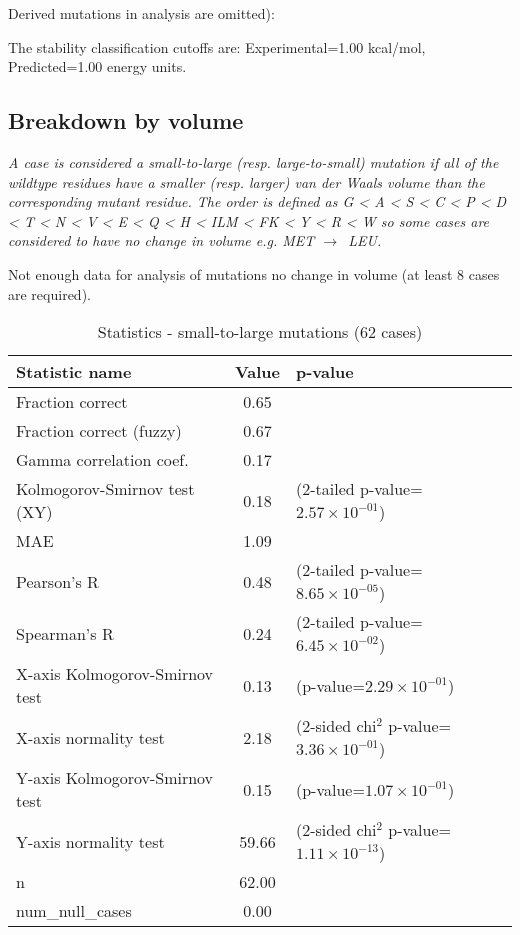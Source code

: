 \documentclass[10pt, letterpaper, oneside, titlepage, landscape]{scrreprt}
\begin{document}
Derived mutations in analysis are omitted):

The stability classification cutoffs are: Experimental=1.00 kcal/mol, Predicted=1.00 energy units.
\subsection{Breakdown by volume}
\textit{A case is considered a small-to-large (resp. large-to-small) mutation if all of the wildtype residues have a smaller (resp. larger) van der Waals volume than the corresponding mutant residue. The order is defined as G < A < S < C < P < D < T < N < V < E < Q < H < ILM < FK < Y < R < W so some cases are considered to have no change in volume e.g. MET $\rightarrow$\ LEU.}

Not enough data for analysis of mutations no change in volume (at least 8 cases are required).


\begin{table}[H]\begin{center}
\begin{tabular}{ l S[table-format=3.2] l}
Statistic name & {Value} & p-value\\
\hline
Fraction correct & 0.65 & \\
Fraction correct (fuzzy) & 0.67 & \\
Gamma correlation coef. & 0.17 & \\
Kolmogorov-Smirnov test (XY) & 0.18 & (2-tailed p-value=$2.57\times10^{-01}$)\\
MAE & 1.09 & \\
Pearson's R & 0.48 & (2-tailed p-value=$8.65\times10^{-05}$)\\
Spearman's R & 0.24 & (2-tailed p-value=$6.45\times10^{-02}$)\\
X-axis Kolmogorov-Smirnov test & 0.13 & (p-value=$2.29\times10^{-01}$)\\
X-axis normality test & 2.18 & (2-sided chi$^{2}$ p-value=$3.36\times10^{-01}$)\\
Y-axis Kolmogorov-Smirnov test & 0.15 & (p-value=$1.07\times10^{-01}$)\\
Y-axis normality test & 59.66 & (2-sided chi$^{2}$ p-value=$1.11\times10^{-13}$)\\
n & 62.00 & \\
num\_null\_cases & 0.00 & \\
\end{tabular}
\caption{Statistics - small-to-large mutations (62 cases)}
\end{center}\end{table}
\end{document}
